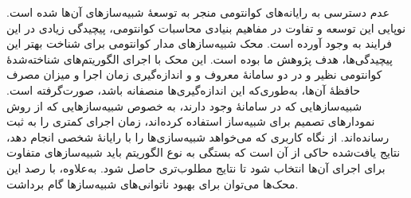 عدم دسترسی به رایانه‌های کوانتومی منجر به توسعهٔ شبیه‌سازهای آن‌ها شده است. نوپایی این توسعه و تفاوت در مفاهیم بنیادی محاسبات کوانتومی، پیچیدگی زیادی در این فرایند به وجود آورده است. محک شبیه‌سازهای مدار کوانتومی برای شناخت بهتر این پیچیدگی‌ها، هدف پژوهش ما بوده است. این محک با اجرای الگوریتم‌های شناخته‌شدهٔ کوانتومی نظیر
و
در دو سامانهٔ معروف 
و
و اندازه‌گیری زمان اجرا و میزان مصرف حافظهٔ آن‌ها، به‌طوری‌که این اندازه‌گیری‌ها منصفانه باشد، صورت‌گرفته است. شبیه‌سازهایی که در سامانهٔ
وجود دارند، به خصوص شبیه‌سازهایی که از روش نمودارهای تصمیم برای شبیه‌ساز استفاده کرده‌اند، زمان اجرای کمتری را به ثبت رسانده‌اند. از نگاه کاربری که می‌خواهد شبیه‌سازی‌ها را با رایانهٔ شخصی انجام دهد، نتایج یافت‌شده حاکی از آن است که بستگی به نوع الگوریتم باید شبیه‌سازهای متفاوت برای اجرای آن‌ها انتخاب شود تا نتایج مطلوب‌تری حاصل شود. به‌علاوه، با رصد این محک‌ها می‌توان برای بهبود ناتوانی‌های شبیه‌سازها گام برداشت.
